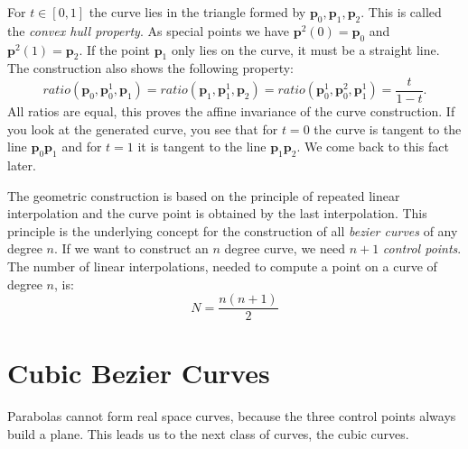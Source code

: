\documentclass[titlepage,a4paper,11pt]{report}
\def\it{\textit}
\def\mb{\mathbf}
\def\fr{\frac}
\begin{document}
For $t\in [0,1]$ the curve lies in the triangle formed by
$\mb{p}_0,\mb{p}_1,\mb{p}_2$. This is called the \it{convex hull property}.
As special points we have $\mb{p}^2(0)=\mb{p}_0$ and $\mb{p}^2(1)=\mb{p}_2$.
If the point $\mb{p}_1$ only lies on the curve, it must be a straight line.
The construction also shows the following property:
\begin{equation}
  ratio(\mb{p}_0,\mb{p}_0^1,\mb{p}_1)=ratio(\mb{p}_1,\mb{p}_1^1,\mb{p}_2)
  =ratio(\mb{p}_0^1,\mb{p}_0^2,\mb{p}_1^1)=\fr{t}{1-t}.
\end{equation}
All ratios are equal, this proves the affine invariance of the curve
construction. If you look at the generated curve, you see that for $t=0$
the curve is tangent to the line $\mb{p}_0\mb{p}_1$ and for $t=1$ it is
tangent to the line $\mb{p}_1\mb{p}_2$. We come back to this fact later.

The geometric construction is based on the principle of repeated linear
interpolation and the curve point is obtained by the last interpolation.
This principle is the underlying concept for the construction of all
\it{bezier curves} of any degree $n$. If we want to construct an $n$
degree curve, we need $n+1$ \it{control points}. The number of linear
interpolations, needed to compute a point on a curve of degree $n$, is:
\begin{equation}
  N=\fr{n(n+1)}{2}
\end{equation}

\section{Cubic Bezier Curves}
Parabolas cannot form real space curves, because the three control points
always build a plane. This leads us to the next class of curves, the cubic
curves.
\end{document}

